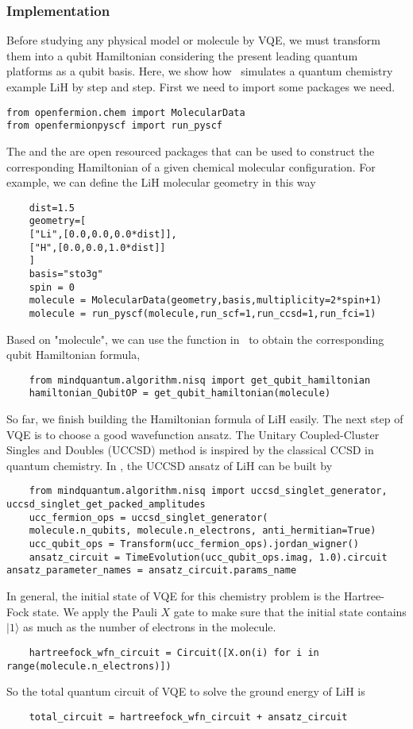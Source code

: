\subsubsection{Implementation}

Before studying any physical model or molecule by VQE, we must transform them into a qubit Hamiltonian considering the present leading quantum platforms as a qubit basis.
Here, we show how \MindQuantum\ simulates a quantum chemistry example LiH by step and step.
First we need to import some packages we need.
\begin{lstlisting}
from openfermion.chem import MolecularData
from openfermionpyscf import run_pyscf
\end{lstlisting}
The  and the  are open resourced packages that can be used to construct the corresponding Hamiltonian of a given chemical molecular configuration. For example, we can define the LiH molecular geometry in this way
\begin{lstlisting}
    dist=1.5
    geometry=[
    ["Li",[0.0,0.0,0.0*dist]],
    ["H",[0.0,0.0,1.0*dist]]
    ]
    basis="sto3g"
    spin = 0
    molecule = MolecularData(geometry,basis,multiplicity=2*spin+1)
    molecule = run_pyscf(molecule,run_scf=1,run_ccsd=1,run_fci=1)
\end{lstlisting}
Based on "molecule", we can use the function in \MindQuantum\ to obtain the corresponding qubit Hamiltonian formula,
\begin{lstlisting}
    from mindquantum.algorithm.nisq import get_qubit_hamiltonian
    hamiltonian_QubitOP = get_qubit_hamiltonian(molecule)
\end{lstlisting}
So far, we finish building the Hamiltonian formula of LiH easily.
The next step of VQE is to choose a good wavefunction ansatz. The Unitary Coupled-Cluster Singles and Doubles (UCCSD) method is inspired by the classical CCSD in quantum chemistry. In \MindQuantum, the UCCSD ansatz of LiH can be built by
\begin{lstlisting}
    from mindquantum.algorithm.nisq import uccsd_singlet_generator, uccsd_singlet_get_packed_amplitudes
    ucc_fermion_ops = uccsd_singlet_generator(
    molecule.n_qubits, molecule.n_electrons, anti_hermitian=True)
    ucc_qubit_ops = Transform(ucc_fermion_ops).jordan_wigner()
    ansatz_circuit = TimeEvolution(ucc_qubit_ops.imag, 1.0).circuit
ansatz_parameter_names = ansatz_circuit.params_name
\end{lstlisting}
In general, the initial state of VQE for this chemistry problem is the Hartree-Fock state. We apply the Pauli $X$ gate to make sure that the initial state contains $|1\rangle$ as much as the number of electrons in the molecule.
\begin{lstlisting}
    hartreefock_wfn_circuit = Circuit([X.on(i) for i in range(molecule.n_electrons)])
\end{lstlisting}
So the total quantum circuit of VQE to solve the ground energy of LiH is
\begin{lstlisting}
    total_circuit = hartreefock_wfn_circuit + ansatz_circuit
\end{lstlisting}

